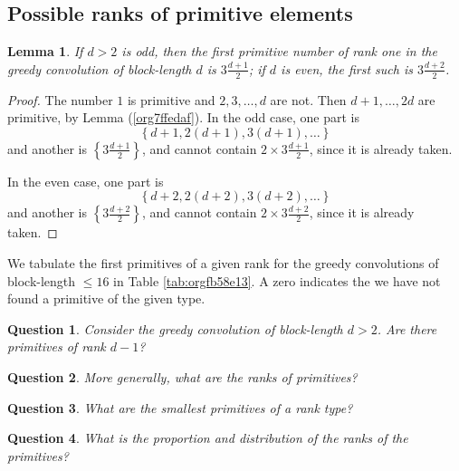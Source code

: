 \documentclass[12pt]{article}
\theoremstyle{definition}
\theoremstyle{remark}
\theoremstyle{plain}
\newtheorem{lemma}{Lemma}
\newtheorem{question}{Question}
\newcommand{\set}[1]{\left\{{#1}\right\}}
\begin{document}
\subsection{Possible ranks of primitive elements}
\label{sec:orgf2cbb70}
\begin{lemma}
If \(d > 2\) is odd, then the first primitive number of rank one in the greedy convolution of block-length \(d\)
is \(3\frac{d+1}{2}\); if \(d\) is even, the first such is \(3 \frac{d+2}{2}\).
\end{lemma}
\begin{proof}
The number \(1\) is primitive and \(2,3,\dots,d\) are not. Then \(d+1,\dots,2d\) are primitive, by Lemma (\ref{org7ffedaf}).
In the odd case, one part is
\[\set{d+1, 2(d+1),3(d+1),\dots}\] and another is
\(\set{3\frac{d+1}{2}}\), and cannot contain \(2 \times 3\frac{d+1}{2}\), since it is already taken.

In the even case, one part is \[\set{d+2, 2(d+2),3(d+2),\dots}\] and another is
\(\set{3\frac{d+2}{2}}\), and cannot contain \(2 \times 3\frac{d+2}{2}\), since it is already taken.
\end{proof}

We tabulate the first primitives of a given rank for the greedy convolutions of block-length  \(\le 16\) in
Table \ref{tab:orgfb58e13}. A zero indicates the we have not found a primitive of the given type.

\begin{question}
Consider the greedy convolution of block-length \(d>2\).
Are there primitives of rank \(d-1\)?
\end{question}

\begin{question}
More generally, what are the ranks of primitives?
\end{question}

\begin{question}
What are the smallest primitives of a rank type?
\end{question}

\begin{question}
What is the proportion and distribution of the ranks of the primitives?
\end{question}
\end{document}
